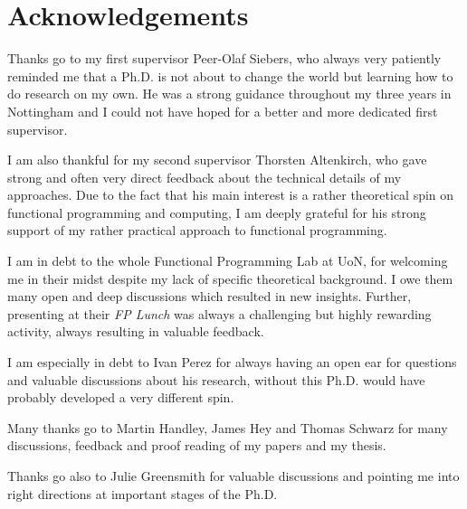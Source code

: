 \chapter*{Acknowledgements}
Thanks go to my first supervisor Peer-Olaf Siebers, who always very patiently reminded me that a Ph.D. is not about to change the world but learning how to do research on my own. He was a strong guidance throughout my three years in Nottingham and I could not have hoped for a better and more dedicated first supervisor.

I am also thankful for my second supervisor Thorsten Altenkirch, who gave strong and often very direct feedback about the technical details of my approaches. Due to the fact that his main interest is a rather theoretical spin on functional programming and computing, I am deeply grateful for his strong support of my rather practical approach to functional programming.

I am in debt to the whole Functional Programming Lab at UoN, for welcoming me in their midst despite my lack of specific theoretical background. I owe them many open and deep discussions which resulted in new insights. Further, presenting at their \textit{FP Lunch} was always a challenging but highly rewarding activity, always resulting in valuable feedback.

I am especially in debt to Ivan Perez for always having an open ear for questions and valuable discussions about his research, without this Ph.D. would have probably developed a very different spin.

Many thanks go to Martin Handley, James Hey and Thomas Schwarz for many discussions, feedback and proof reading of my papers and my thesis.

Thanks go also to Julie Greensmith for valuable discussions and pointing me into right directions at important stages of the Ph.D.